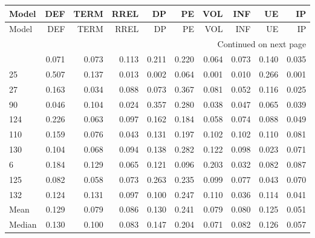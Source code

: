 \begin{longtable}{lrrrrrrrrr}
\label{tab:Importance_standardised_10_retrained}\\
\toprule
 Model &   DEF &  TERM &  RREL &    DP &    PE &   VOL &   INF &    UE &    IP \\
\midrule
\endfirsthead

\toprule
 Model &   DEF &  TERM &  RREL &    DP &    PE &   VOL &   INF &    UE &    IP \\
\midrule
\endhead
\midrule
\multicolumn{10}{r}{{Continued on next page}} \\
\midrule
\endfoot

\bottomrule
\endlastfoot
    76 & 0.071 & 0.073 & 0.113 & 0.211 & 0.220 & 0.064 & 0.073 & 0.140 & 0.035 \\
    25 & 0.507 & 0.137 & 0.013 & 0.002 & 0.064 & 0.001 & 0.010 & 0.266 & 0.001 \\
    27 & 0.163 & 0.034 & 0.088 & 0.073 & 0.367 & 0.081 & 0.052 & 0.116 & 0.025 \\
    90 & 0.046 & 0.104 & 0.024 & 0.357 & 0.280 & 0.038 & 0.047 & 0.065 & 0.039 \\
   124 & 0.226 & 0.063 & 0.097 & 0.162 & 0.184 & 0.058 & 0.074 & 0.088 & 0.049 \\
   110 & 0.159 & 0.076 & 0.043 & 0.131 & 0.197 & 0.102 & 0.102 & 0.110 & 0.081 \\
   130 & 0.104 & 0.068 & 0.094 & 0.138 & 0.282 & 0.122 & 0.098 & 0.023 & 0.071 \\
     6 & 0.184 & 0.129 & 0.065 & 0.121 & 0.096 & 0.203 & 0.032 & 0.082 & 0.087 \\
   125 & 0.082 & 0.058 & 0.073 & 0.263 & 0.235 & 0.099 & 0.077 & 0.043 & 0.070 \\
   132 & 0.124 & 0.131 & 0.097 & 0.100 & 0.247 & 0.110 & 0.036 & 0.114 & 0.041 \\
  Mean & 0.129 & 0.079 & 0.086 & 0.130 & 0.241 & 0.079 & 0.080 & 0.125 & 0.051 \\
Median & 0.130 & 0.100 & 0.083 & 0.147 & 0.204 & 0.071 & 0.082 & 0.126 & 0.057 \\
\end{longtable}
